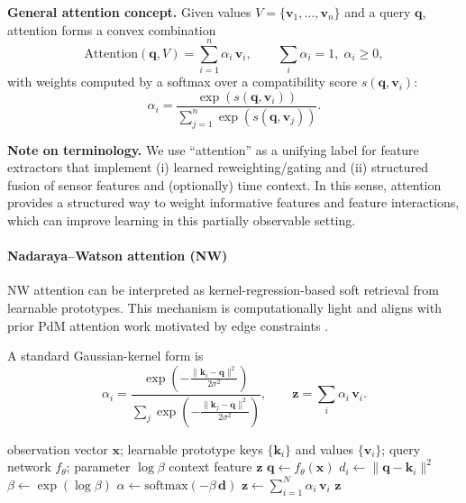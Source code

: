 \documentclass[sn-basic]{sn-jnl} %
\begin{document}
\textbf{General attention concept.}
Given values $V=\{\mathbf{v}_1,\ldots,\mathbf{v}_n\}$ and a query $\mathbf{q}$, attention forms a convex combination
\begin{equation}
\mathrm{Attention}(\mathbf{q},V)=\sum_{i=1}^{n}\alpha_i\,\mathbf{v}_i,\qquad \sum_i\alpha_i=1,\;\alpha_i\ge 0,
\end{equation}
with weights computed by a softmax over a compatibility score $s(\mathbf{q},\mathbf{v}_i)$:
\begin{equation}
\alpha_i = \frac{\exp(s(\mathbf{q},\mathbf{v}_i))}{\sum_{j=1}^n\exp(s(\mathbf{q},\mathbf{v}_j))}.
\end{equation}

\textbf{Note on terminology.}
We use ``attention'' as a unifying label for feature extractors that implement (i) learned reweighting/gating and (ii) structured fusion of sensor features and (optionally) time context. In this sense, attention provides a structured way to weight informative features and feature interactions, which can improve learning in this partially observable setting.

\paragraph{Nadaraya--Watson attention (NW)}
NW attention can be interpreted as kernel-regression-based soft retrieval from learnable prototypes. This mechanism is computationally light and aligns with prior PdM attention work motivated by edge constraints \cite{Siraskar2024}.

A standard Gaussian-kernel form is
\begin{equation}
\alpha_i = \frac{\exp\left(-\tfrac{\lVert \mathbf{k}_i-\mathbf{q}\rVert^2}{2\sigma^2}\right)}{\sum_j \exp\left(-\tfrac{\lVert \mathbf{k}_j-\mathbf{q}\rVert^2}{2\sigma^2}\right)},
\qquad \mathbf{z}=\sum_i\alpha_i\,\mathbf{v}_i.
\end{equation}

\begin{algorithm}[t]
\caption{NW attention feature extractor (forward pass)}
\label{alg:nw_forward}
\begin{algorithmic}[1]
\Require observation vector $\mathbf{x}$; learnable prototype keys $\{\mathbf{k}_i\}$ and values $\{\mathbf{v}_i\}$; query network $f_\theta$; parameter $\log\beta$
\Ensure context feature $\mathbf{z}$
\State $\mathbf{q} \gets f_\theta(\mathbf{x})$ 
        \State $d_i \gets \lVert \mathbf{q}-\mathbf{k}_i\rVert^2$
\EndFor
\State $\beta \gets \exp(\log\beta)$ 
\State $\alpha \gets \mathrm{softmax}(-\beta\,\mathbf{d})$ 
\State $\mathbf{z} \gets \sum_{i=1}^{N} \alpha_i\,\mathbf{v}_i$
\State \Return $\mathbf{z}$
\end{algorithmic}
\end{algorithm}
\end{document}
